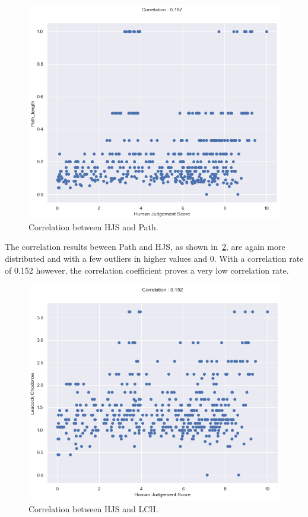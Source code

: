 \documentclass[conference]{IEEEtran}
\begin{document}
\begin{figure}[h]
\centerline{\includegraphics[scale=0.5]{img/pathcorr.png}}
\caption{Correlation between HJS and Path.}
\label{fig:pathcorr}
\end{figure}

The correlation results beween Path and HJS, as shown in~\ref{fig:lchcorr}, are again more distributed and with a few outliers in higher values and 0. With a correlation rate of 0.152 however, the correlation coefficient proves a very low correlation rate.

\begin{figure}[h]
\centerline{\includegraphics[scale=0.5]{img/lchcorr.png}}
\caption{Correlation between HJS and LCH.}
\label{fig:lchcorr}
\end{figure}
\end{document}
